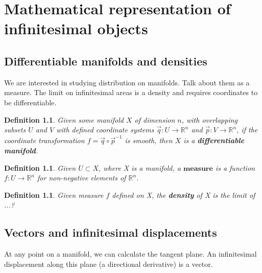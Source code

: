 \documentclass{book}
\newtheorem{defn}[equation]{Definition}
\begin{document}

	





\chapter{Mathematical representation of infinitesimal objects}



\section{Differentiable manifolds and densities}
We are interested in studying distribution on manifolds. Talk about them as a measure. The limit on infinitesimal areas is a density and requires coordinates to be differentiable.


\begin{defn}
	Given some manifold $X$ of dimension $n$, with overlapping subsets $U$ and $V$ with defined coordinate systems $\vec{q}: U \to \mathbb{R}^n$ and $\vec{p}: V \to \mathbb{R}^n$, if the coordinate transformation $f = \vec{q} \circ \vec{p}^{-1}$ is smooth, then $X$ is a \textbf{differentiable manifold}. 
\end{defn}

\begin{defn}
	Given $U \subset X$, where X is a manifold, a $\textbf{measure}$ is a function $f : U \to \mathbb{R}^n$ for non-negative elements of $\mathbb{R}^n$. 
\end{defn}

\begin{defn}
	Given measure $f$ defined on X, the \textbf{density} of X is the limit of ...?
\end{defn}



\section{Vectors and infinitesimal displacements}
At any point on a manifold, we can calculate the tangent plane. An infinitesimal displacement along this plane (a directional derivative) is a vector. 
\end{document}
